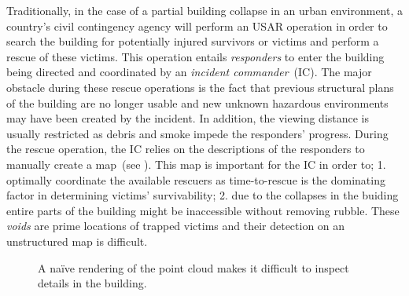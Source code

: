 Traditionally, in the case of a partial building collapse in an urban environment, a country's civil contingency agency will perform an USAR operation in order to search the building for potentially injured survivors or victims and perform a rescue of these victims.  This operation entails \emph{responders} to enter the building being directed and coordinated by an \emph{incident commander}~(IC).  The major obstacle during these rescue operations is the fact that previous structural plans of the building are no longer usable and new unknown hazardous environments may have been created by the incident.  In addition, the viewing distance is usually restricted as debris and smoke impede the responders' progress.  During the rescue operation, the IC relies on the descriptions of the responders to manually create a map~(see ).  This map is important for the IC in order to; 1. optimally coordinate the available rescuers as time-to-rescue is the dominating factor in determining victims' survivability; 2. due to the collapses in the buiding entire parts of the building might be inaccessible without removing rubble.  These \emph{voids} are prime locations of trapped victims and their detection on an unstructured  map is difficult.

\begin{figure}
\centering
{}
\caption{A na\"ive rendering of the point cloud makes it difficult to inspect details in the building.}
\label{contributions:usar:map:pointcloud}
\end{figure}

